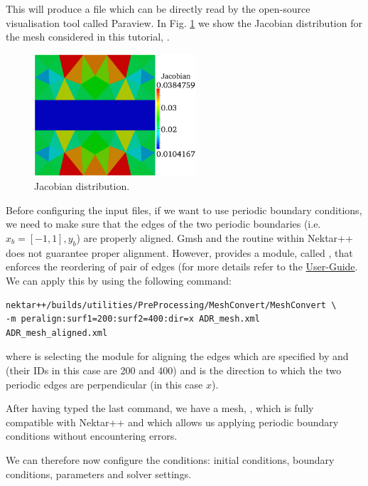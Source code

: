 This will produce a  file which can be directly read by the open-source 
visualisation tool called Paraview. In Fig. \ref{f:Jac} we show the Jacobian distribution for the 
mesh considered in this tutorial, .
%
\begin{figure}[h!]
\begin{center}
\includegraphics[width=6cm]{Figures/ADR_mesh_jacobian.png}
\caption{Jacobian distribution.}
\label{f:Jac}
\end{center}
\end{figure}
%
Before configuring the input files, if we want to use periodic boundary conditions, we 
need to make sure that the edges of the two periodic boundaries (i.e. $x_{b} = [-1, 1],
y_{b}$) are properly aligned. Gmsh and the  routine within Nektar++ 
does not guarantee proper alignment. However,  provides a module, 
called , that enforces the reordering of pair of edges (for more details 
refer to the \href{http://www.nektar.info/downloads/8}{User-Guide}. 
We can apply this by using the following command:
%
\begin{lstlisting}[style=BashInputStyle]
nektar++/builds/utilities/PreProcessing/MeshConvert/MeshConvert \
-m peralign:surf1=200:surf2=400:dir=x ADR_mesh.xml ADR_mesh_aligned.xml
\end{lstlisting}
%
where  is selecting the module for aligning the edges which are 
specified by \inltt{surf1} and \inltt{surf2} (their IDs in this case are 200 and 400) 
and \inltt{dir} is the direction to which the two periodic edges are perpendicular 
(in this case $x$).

After having typed the last command, we have a mesh, ,
which is fully compatible with Nektar++ and which allows us applying periodic boundary 
conditions without encountering errors. 

We can therefore now configure the conditions: initial conditions, boundary conditions, 
parameters and solver settings. 

